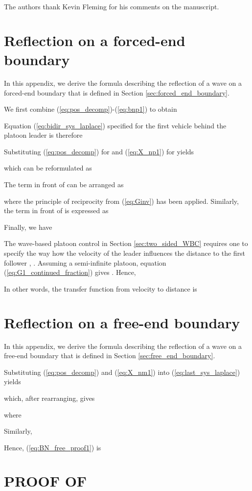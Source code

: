 \documentclass[final,5p,times,twocolumn]{elsarticle}
\begin{document}
The authors thank Kevin Fleming for his comments on the manuscript.

\appendix
\section{Reflection on a forced-end boundary}
\label{sec:app_forced_end}
In this appendix, we derive the formula describing the reflection of a wave on a forced-end boundary that is defined in Section \ref{sec:forced_end_boundary}.

We first combine (\ref{eq:pos_decomp})-(\ref{eq:bnp1}) to obtain

Equation (\ref{eq:bidir_sys_laplace}) specified for the first vehicle behind the platoon leader is therefore

Substituting (\ref{eq:pos_decomp}) for   and (\ref{eq:X_np1}) for  yields

which can be reformulated as

The term in front of  can be arranged as

where the principle of reciprocity from (\ref{eq:Ginv}) has been applied. Similarly, the term in front of  is expressed as

Finally, we have


The wave-based platoon control in Section \ref{sec:two_sided_WBC} requires one to specify the way how the velocity of the leader  influences the distance to the first follower , . Assuming a semi-infinite platoon, equation (\ref{eq:G1_continued_fraction}) gives . Hence,

In other words, the transfer function from velocity  to distance  is


\section{Reflection on a free-end boundary}
\label{sec:app_free_end}
In this appendix, we derive the formula describing the reflection of a wave on a free-end boundary that is defined in Section \ref{sec:free_end_boundary}.

Substituting (\ref{eq:pos_decomp}) and (\ref{eq:X_nm1}) into (\ref{eq:last_sys_laplace}) yields

which, after rearranging, gives

where

Similarly,

Hence, (\ref{eq:BN_free_proof1}) is



\section{PROOF OF }
\label{app:string_stability}
\end{document}
